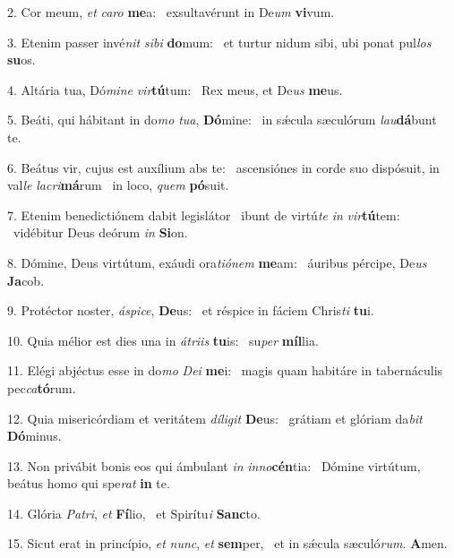 2. Cor meum, \textit{et} \textit{ca}\textit{ro} \textbf{me}a: \ast\  exsultavérunt in De\textit{um} \textbf{vi}vum.\

3. Etenim passer invé\textit{nit} \textit{si}\textit{bi} \textbf{do}mum: \ast\  et turtur nidum sibi, ubi ponat pul\textit{los} \textbf{su}os.\

4. Altária tua, Dó\textit{mi}\textit{ne} \textit{vir}\textbf{tú}tum: \ast\  Rex meus, et De\textit{us} \textbf{me}us.\

5. Beáti, qui hábitant in do\textit{mo} \textit{tu}\textit{a}, \textbf{Dó}mine: \ast\  in sǽcula sæculórum \textit{lau}\textbf{dá}bunt te.\

6. Beátus vir, cujus est auxílium abs te: \dag\  ascensiónes in corde suo dispósuit, in val\textit{le} \textit{la}\textit{cri}\textbf{má}rum \ast\  in loco, \textit{quem} \textbf{pó}suit.\

7. Etenim benedictiónem dabit legislátor \dag\  ibunt de virtú\textit{te} \textit{in} \textit{vir}\textbf{tú}tem: \ast\  vidébitur Deus deórum \textit{in} \textbf{Si}on.\

8. Dómine, Deus virtútum, exáudi ora\textit{ti}\textit{ó}\textit{nem} \textbf{me}am: \ast\  áuribus pércipe, De\textit{us} \textbf{Ja}cob.\

9. Protéctor noster, \textit{á}\textit{spi}\textit{ce}, \textbf{De}us: \ast\  et réspice in fáciem Chris\textit{ti} \textbf{tu}i.\

10. Quia mélior est dies una in \textit{á}\textit{tri}\textit{is} \textbf{tu}is: \ast\  su\textit{per} \textbf{míl}lia.\

11. Elégi abjéctus esse in do\textit{mo} \textit{De}\textit{i} \textbf{me}i: \ast\  magis quam habitáre in tabernáculis pec\textit{ca}\textbf{tó}rum.\

12. Quia misericórdiam et veritátem \textit{dí}\textit{li}\textit{git} \textbf{De}us: \ast\  grátiam et glóriam da\textit{bit} \textbf{Dó}minus.\

13. Non privábit bonis eos qui ámbulant \textit{in} \textit{in}\textit{no}\textbf{cén}tia: \ast\  Dómine virtútum, beátus homo qui spe\textit{rat} \textbf{in} te.\

14. Glória \textit{Pa}\textit{tri}, \textit{et} \textbf{Fí}lio, \ast\  et Spirítu\textit{i} \textbf{Sanc}to.\

15. Sicut erat in princípio, \textit{et} \textit{nunc}, \textit{et} \textbf{sem}per, \ast\  et in sǽcula sæculó\textit{rum}. \textbf{A}men.\

